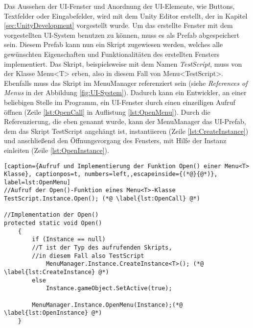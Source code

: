 Das Aussehen der UI-Fenster und Anordnung der UI-Elemente, wie Buttons, Textfelder oder Eingabefelder, wird mit dem Unity Editor erstellt, der in Kapitel \ref{sec:UnityDevelopment} vorgestellt wurde. Um das erstellte Fenster mit dem vorgestellten UI-System benutzen zu können, muss es als Prefab abgespeichert sein. Diesem Prefab kann nun ein Skript zugewiesen werden, welches alle gewünschten Eigenschaften und Funktionalitäten des erstellten Fensters implementiert. Das Skript, beispielsweise mit dem Namen \textit{TestScript}, muss von der Klasse Menu<T> erben, also in diesem Fall von Menu<TestScript>. Ebenfalls muss das Skript im MenuManager referenziert sein (siehe \textit{References of Menus} in der Abbildung \ref{fig:UI-System}). Dadurch kann ein Entwickler, an einer beliebigen Stelle im Programm, ein UI-Fenster durch einen einzeiligen Aufruf öffnen (Zeile \ref{lst:OpenCall} in Auflistung \ref{lst:OpenMenu}). Durch die Referenzierung, die eben genannt wurde, kann der MenuManager das UI-Prefab, dem das Skript TestScript angehängt ist, instantiieren (Zeile \ref{lst:CreateInstance}) und anschließend den Öffnungsvorgang des Fensters, mit Hilfe der Instanz einleiten (Zeile \ref{lst:OpenInstance}). 

\begin{lstlisting}[caption={Aufruf und Implementierung der Funktion Open() einer Menu<T> Klasse}, captionpos=t, numbers=left,,escapeinside={(*@}{@*)}, label=lst:OpenMenu]
//Aufruf der Open()-Funktion eines Menu<T>-Klasse
TestScript.Instance.Open(); (*@ \label{lst:OpenCall} @*)

//Implementation der Open()
protected static void Open()
    {
        if (Instance == null)
		//T ist der Typ des aufrufenden Skripts, 
		//in diesem Fall also TestScript
            MenuManager.Instance.CreateInstance<T>(); (*@ \label{lst:CreateInstance} @*)
        else
            Instance.gameObject.SetActive(true);

        MenuManager.Instance.OpenMenu(Instance);(*@ \label{lst:OpenInstance} @*)
    }
\end{lstlisting}
\quad

